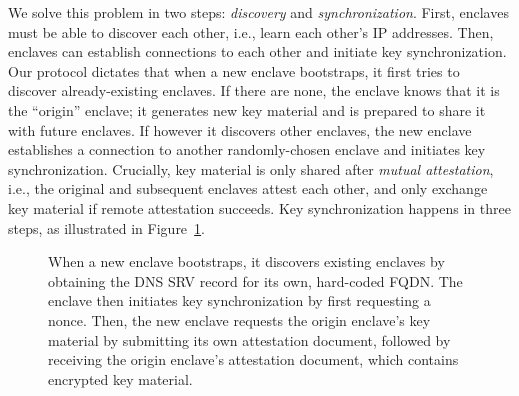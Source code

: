 We solve this problem in two steps: \emph{discovery} and
\emph{synchronization}.  First, enclaves must be able to discover each other,
i.e., learn each other's IP addresses.  Then, enclaves can establish
connections to each other and initiate key synchronization.  Our protocol
dictates that when a new enclave bootstraps, it first tries to discover
already-existing enclaves.  If there are none, the enclave knows that it is the
``origin'' enclave; it generates new key material and is prepared to share it
with future enclaves.  If however it discovers other enclaves, the new enclave
establishes a connection to another randomly-chosen enclave and initiates key
synchronization.  Crucially, key material is only shared after \emph{mutual
attestation}, i.e., the original and subsequent enclaves attest each other, and
only exchange key material if remote attestation succeeds.  Key synchronization
happens in three steps, as illustrated in Figure~\ref{fig:key-synchronization}.

\begin{figure}[t]
  \centering
  
  \caption{When a new enclave bootstraps, it discovers existing enclaves by
    obtaining the DNS SRV record for its own, hard-coded FQDN.  The enclave then
    initiates key synchronization by first requesting a nonce.  Then, the new
    enclave requests the origin enclave's key material by submitting its own
    attestation document, followed by receiving the origin enclave's attestation
    document, which contains encrypted key material.}
  \label{fig:key-synchronization}
\end{figure}

